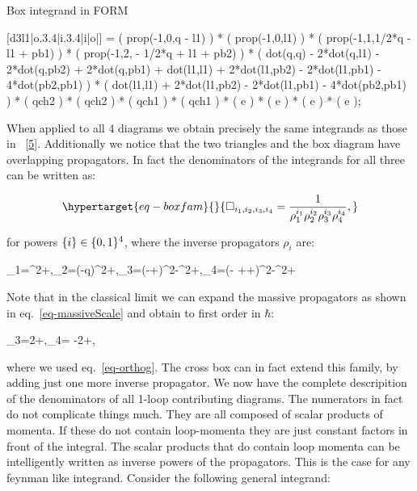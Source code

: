 \documentclass[
  10pt,
  a4paper,
  DIV=11,
  numbers=noendperiod,
  twoside]{scrreprt}
\newenvironment{Shaded}{\begin{snugshade}}{\end{snugshade}}
\newcommand{\NormalTok}[1]{\textcolor[rgb]{0.00,0.23,0.31}{#1}}
\let\[\relax \let\]\relax %
\DeclareRobustCommand{\[}{\begin{equation}}
\DeclareRobustCommand{\]}{\end{equation}}
\begin{document}
\begin{codelisting}

\caption{Box integrand in FORM}

\hypertarget{lst-formBox}{%
\label{lst-formBox}}%
\begin{Shaded}
\begin{Highlighting}[]

\NormalTok{   [d3l1|o.3.4|i.3.4|i|o|] =}
\NormalTok{         ( prop({-}1,0,q {-} l1) )}
\NormalTok{       * ( prop({-}1,0,l1) )}
\NormalTok{       * ( prop({-}1,1,1/2*q {-} l1 + pb1) )}
\NormalTok{       * ( prop({-}1,2, {-} 1/2*q + l1 + pb2) )}
\NormalTok{       * ( dot(q,q) {-} 2*dot(q,l1) {-} 2*dot(q,pb2) + 2*dot(q,pb1) + dot(l1,l1)}
\NormalTok{          + 2*dot(l1,pb2) {-} 2*dot(l1,pb1) {-} 4*dot(pb2,pb1) )}
\NormalTok{       * ( dot(l1,l1) + 2*dot(l1,pb2) {-} 2*dot(l1,pb1) {-} 4*dot(pb2,pb1) )}
\NormalTok{       * ( qch2 ) * ( qch2 ) * ( qch1 ) * ( qch1 )}
\NormalTok{       * ( e ) * ( e ) * ( e ) * ( e );}
\end{Highlighting}
\end{Shaded}

\end{codelisting}

When applied to all 4 diagrams we obtain precisely the same integrands
as those in ~{[}\protect\hyperlink{ref-Kosower:2018adc}{5}{]}.
Additionally we notice that the two triangles and the box diagram have
overlapping propagators. In fact the denominators of the integrands for
all three can be written as:

\begin{equation}\protect\hypertarget{eq-boxfam}{}{
\Box_{i_1,i_2,i_3,i_4}=\inv{\rho_1^{i_1}\rho_2^{i_2}\rho_3^{i_3}\rho_4^{i_4}},
}\label{eq-boxfam}\end{equation}

for powers \(\{i \}\in\{0,1 \}^4\), where the inverse propagators
\(\rho_i\) are:

\[
\rho_1=\ell^2+\im \epsilon,\quad \rho_2=(\ell-q)^2+\im \epsilon,\quad \rho_3=(\Half[q]-\ell+\semom[1])^2-\mass[1]^2+\im \epsilon,\quad \rho_4=(-  \Half[q]+\ell+\semom[2])^2-\mass[2]^2+\im \epsilon
\]

Note that in the classical limit we can expand the massive propagators
as shown in eq.~\ref{eq-massiveScale} and obtain to first order in
\(\hbar\):

\[
\rho_3=2\ell\cdot\semom[1]+\im \epsilon,\quad \rho_4= -2\ell\cdot\semom[2]+\im \epsilon,
\]

where we used eq.~\ref{eq-orthog}. The cross box can in fact extend this
family, by adding just one more inverse propagator. We now have the
complete descripition of the denominators of all 1-loop contributing
diagrams. The numerators in fact do not complicate things much. They are
all composed of scalar products of momenta. If these do not contain
loop-momenta they are just constant factors in front of the integral.
The scalar products that do contain loop momenta can be intelligently
written as inverse powers of the propagators. This is the case for any
feynman like integrand. Consider the following general integrand:
\end{document}

